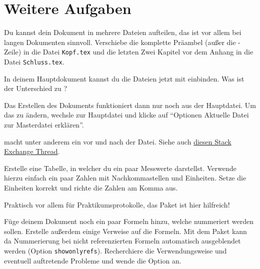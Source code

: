 \section{Weitere Aufgaben}
    \begin{uebung}
        \item Du kannst dein Dokument in mehrere Dateien aufteilen, das ist vor
        allem bei langen Dokumenten sinnvoll. Verschiebe die komplette Präambel
        (außer die -Zeile) in die Datei \texttt{Kopf.tex} und
        die letzten Zwei Kapitel vor dem Anhang in die Datei \texttt{Schluss.tex}.

        In deinem Hauptdokument kannst du die Dateien jetzt mit
         einbinden. Was ist der Unterschied zu
        ?
            \begin{hinweis}
                Das Erstellen des Dokuments funktioniert dann nur noch aus der Hauptdatei.
                Um das zu ändern, wechsle zur Hauptdatei und klicke auf
                \enquote{Optionen \textrightarrow{} Aktuelle Datei zur Masterdatei erklären}.
            \end{hinweis}
            \begin{loesung}
                 macht unter anderem ein  vor und nach
                der Datei. Siehe auch \href{http://tex.stackexchange.com/questions/246/when-should-i-use-input-vs-include}{diesen Stack Exchange Thread}.
            \end{loesung}

        \item Erstelle eine Tabelle, in welcher du ein paar Messwerte darstellst.
            Verwende hierzu einfach ein paar Zahlen mit Nachkommastellen und Einheiten.
            Setze die Einheiten korrekt und richte die Zahlen am Komma aus.
            \begin{hinweis}
                Praktisch vor allem für Praktikumsprotokolle, das Paket  ist
                hier hilfreich!
            \end{hinweis}

        \item Füge deinem Dokument noch ein paar Formeln hinzu, welche nummeriert werden
            sollen. Erstelle außerdem einige Verweise auf die Formeln. Mit dem Paket
             kann da Nummerierung bei nicht referenzierten Formeln
            automatisch ausgeblendet werden (Option \verb|showonlyrefs|). Recherchiere
            die Verwendungsweise und eventuell auftretende Probleme und wende die Option an.


\end{uebung}
